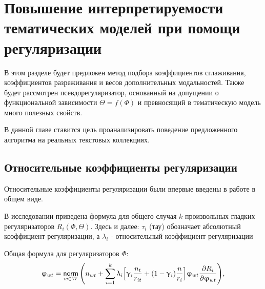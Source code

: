 \chapter{Повышение интерпретируемости тематических моделей при помощи регуляризации}

В этом разделе будет предложен метод подбора коэффициентов сглаживания, коэффициентов разреживания и весов дополнительных модальностей. Также будет рассмотрен псевдорегуляризатор, основанный на допущении о функциональной зависимости $\Theta = f(\Phi)$ и превносящий в тематическую модель много полезных свойств.

В данной главе ставится цель проанализировать поведение предложенного алгоритма на реальных текстовых коллекциях.

\section{Относительные коэффициенты регуляризации}



Относительные коэффициенты регуляризации были впервые введены в работе \cite{doykov} в общем виде.

В исследовании \cite{doykov} приведена формула для общего случая $k$ произвольных гладких регуляризаторов $R_i(\Phi, \Theta)$. Здесь и далее: $\tau_i$ (тау) обозначает абсолютный коэффициент регуляризации, а $\lambda_i$ - относительный коэффициент регуляризации

Общая формула для регуляризаторов $\Phi$:
\[
\upvarphi_{wt} = \mathop{\mathsf{norm}}\limits_{w \in W}\Bigg( 
    n_{wt} + \sum_{i=1}^k \uplambda_i \Big[
        \upgamma_i \frac{n_t}{r_{it}} + (1-\upgamma_i)\frac{n}{r_i}
        \Big] 
    \upvarphi_{wt} \frac{\partial R_i}{\partial \upvarphi_{wt}}
\Bigg), \label{rel_phi_general}
\]

